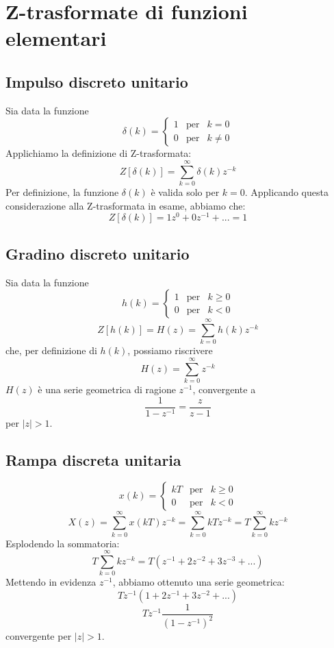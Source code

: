 \documentclass[a4paper]{report}
\begin{document}
\section{Z-trasformate di funzioni elementari}
\subsection{Impulso discreto unitario}
Sia data la funzione
\[
\delta(k) =
\left\{
\begin{array}{lll}
  1 & \textrm{per} & k = 0\\
  0 & \textrm{per} & k \neq 0
\end{array}
\right.
\]
Applichiamo la definizione di Z-trasformata:
\[
Z[\delta(k)] = \sum_{k=0}^{\infty} \delta(k) z^{-k}
\]
Per definizione, la funzione $\delta(k)$ \`e valida solo per
$k=0$. Applicando questa considerazione alla Z-trasformata in esame,
abbiamo che:
\[
Z[\delta(k)] = 1z^{0} + 0z^{-1} + ... = 1
\]

\subsection{Gradino discreto unitario}
Sia data la funzione
\[
h(k) =
\left\{
\begin{array}{lll}
  1 & \textrm{per} & k \geq 0\\
  0 & \textrm{per} & k < 0
\end{array}
\right.
\]
\[
Z[h(k)] = H(z) = \sum_{k=0}^{\infty} h(k) z^{-k}
\]
che, per definizione di $h(k)$, possiamo riscrivere
\[
H(z) = \sum_{k=0}^{\infty} z^{-k}
\]
$H(z)$ \`e una serie geometrica di ragione $z^{-1}$, convergente a
\[
\dfrac{1}{1 - z^{-1}} = \dfrac{z}{z - 1}
\]
per $|z| > 1$.

\subsection{Rampa discreta unitaria}
\[
x(k) =
\left\{
\begin{array}{lll}
  kT & \textrm{per} & k \geq 0\\
  0 & \textrm{per} & k < 0
\end{array}
\right.
\]
\[
X(z) = \sum_{k=0}^{\infty} x(kT) z^{-k} = \sum_{k=0}^{\infty} kT
z^{-k} = T \sum_{k=0}^{\infty} k z^{-k}
\]
Esplodendo la sommatoria:
\[
T \sum_{k=0}^{\infty} k z^{-k} = T (z^{-1} + 2 z^{-2} + 3z^{-3} + ...)
\]
Mettendo in evidenza $z^{-1}$, abbiamo ottenuto una serie geometrica:
\[
T z^{-1}(1 + 2z^{-1} + 3z^{-2} + ...)
\]
\[
T z^{-1} \dfrac{1}{(1 - z^{-1})^{2}}
\]
convergente per $|z| > 1$.
\end{document}
